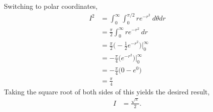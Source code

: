 Switching to polar coordinates,
\begin{align*}
  I^2 &= \int_{0}^{\infty} \int_{0}^{\pi/2} r e^{-r^2}  \ d\theta dr \\
  &= \frac{\pi}{2} \int_{0}^{\infty}  r e^{-r^2}  \ dr \\
  &= \frac{\pi}{2} \Big(-\frac{1}{2}e^{-r^2}\Big)\Big|_{0}^{\infty}  \\
  &= -\frac{\pi}{4} \Big( e^{-r^2}\Big)\Big|_{0}^{\infty}    \\
  &= -\frac{\pi}{4} \Big( 0 - e^0 \Big) \\
  &= \frac{\pi}{4} 
\end{align*}
Taking the square root of both sides of this yields the desired result,
\begin{align*}
  I &= \frac{\sqrt{\pi}}{2} .
\end{align*}


